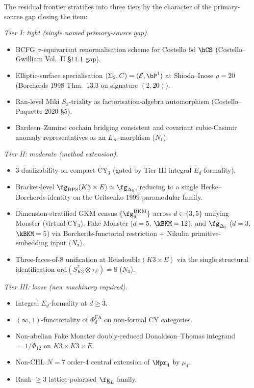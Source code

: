 \begin{theorem}
\label{wn:thm:second-pass-frontier-tiers}

The residual frontier stratifies into three tiers by the character of
the primary-source gap closing the item:

\emph{Tier I: tight (single named primary-source gap).}
\begin{itemize}
\item BCFG $\sigma$-equivariant renormalisation scheme for Costello
$6$d $\hCS$ (Costello--Gwilliam Vol.~II \S$11.1$ gap).
\item Elliptic-surface specialisation
$(\Sigma_2, C) = (\mathcal{E}, \bP^1)$ at Shioda--Inose $\rho = 20$
(Borcherds $1998$ Thm.~$13.3$ on signature $(2, 20)$).
\item Ran-level Miki $S_3$-triality as factorisation-algebra
automorphism (Costello--Paquette $2020$ \S$5$).
\item Bardeen--Zumino cochain bridging consistent and covariant
cubic-Casimir anomaly representatives as an $L_\infty$-morphism
($N_1$).
\end{itemize}

\emph{Tier II: moderate (method extension).}
\begin{itemize}
\item 3-dualizability on compact CY$_3$ (gated by Tier III integral
$E_d$-formality).
\item Bracket-level $\fg_{\mathrm{BPS}}(K3 \times E) \simeq
\fg_{\Delta_5}$, reducing to a single Hecke--Borcherds identity on the
Gritsenko $1999$ paramodular family.
\item Dimension-stratified GKM census $\{\fg^{\mathrm{BKM}}_d\}$
across $d \in \{3, 5\}$ unifying Monster (virtual CY$_3$),
Fake Monster ($d = 5$, $\kBKM = 12$), and $\fg_{\Delta_5}$ ($d = 3$,
$\kBKM = 5$) via Borcherds-functorial restriction + Nikulin
primitive-embedding input ($N_2$).
\item Three-faces-of-$8$ unification at
$\mathrm{Heisdouble}(K3 \times E)$ via the single structural
identification $\mathrm{ord}(S_{K3}^2 \otimes \tau_E) = 8$ ($N_3$).
\end{itemize}

\emph{Tier III: loose (new machinery required).}
\begin{itemize}
\item Integral $E_d$-formality at $d \geq 3$.
\item $(\infty, 1)$-functoriality of $\Phi^{\mathrm{FA}}_d$ on
non-formal CY categories.
\item Non-abelian Fake Monster doubly-reduced Donaldson--Thomas
integrand $= 1/\Phi_{12}$ on $K3 \times K3 \times E$.
\item Non-CHL $N = 7$ order-$4$ central extension of $\Mpr_4$ by
$\mu_4$.
\item Rank-$\geq 3$ lattice-polarised $\fg_L$ family.
\end{itemize}
\end{theorem}


